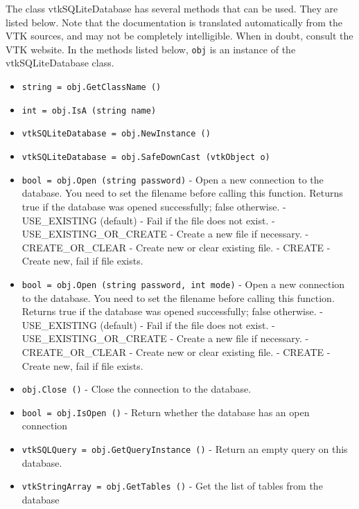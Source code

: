 The class vtkSQLiteDatabase has several methods that can be used.
  They are listed below.
Note that the documentation is translated automatically from the VTK sources,
and may not be completely intelligible.  When in doubt, consult the VTK website.
In the methods listed below, \verb|obj| is an instance of the vtkSQLiteDatabase class.
\begin{itemize}
\item  \verb|string = obj.GetClassName ()|

\item  \verb|int = obj.IsA (string name)|

\item  \verb|vtkSQLiteDatabase = obj.NewInstance ()|

\item  \verb|vtkSQLiteDatabase = obj.SafeDownCast (vtkObject o)|

\item  \verb|bool = obj.Open (string password)| -  Open a new connection to the database.  You need to set the
 filename before calling this function.  Returns true if the
 database was opened successfully; false otherwise.
 - USE\_EXISTING (default) - Fail if the file does not exist.
 - USE\_EXISTING\_OR\_CREATE - Create a new file if necessary.
 - CREATE\_OR\_CLEAR - Create new or clear existing file.
 - CREATE - Create new, fail if file exists.

\item  \verb|bool = obj.Open (string password, int mode)| -  Open a new connection to the database.  You need to set the
 filename before calling this function.  Returns true if the
 database was opened successfully; false otherwise.
 - USE\_EXISTING (default) - Fail if the file does not exist.
 - USE\_EXISTING\_OR\_CREATE - Create a new file if necessary.
 - CREATE\_OR\_CLEAR - Create new or clear existing file.
 - CREATE - Create new, fail if file exists.

\item  \verb|obj.Close ()| -  Close the connection to the database.

\item  \verb|bool = obj.IsOpen ()| -  Return whether the database has an open connection

\item  \verb|vtkSQLQuery = obj.GetQueryInstance ()| -  Return an empty query on this database.

\item  \verb|vtkStringArray = obj.GetTables ()| -  Get the list of tables from the database


\end{itemize}
